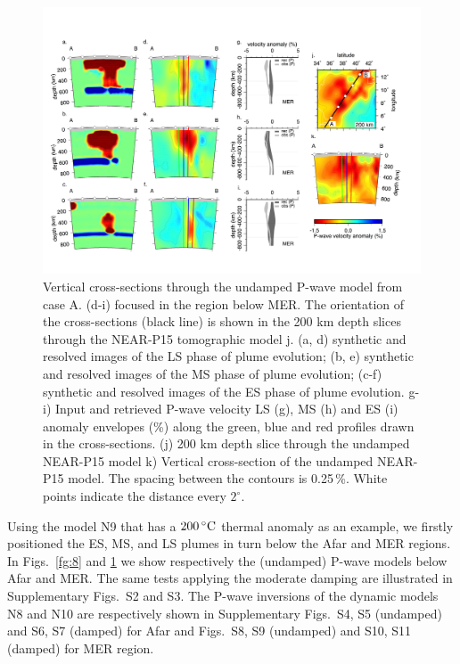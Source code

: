 \documentclass[a4paper,10pt,twocolumn]{paper}
\begin{document}
\begin{figure}
\centering
\includegraphics[width=16cm]{../figures-working/fig10.png}
\caption{Vertical cross-sections through the undamped P-wave model from case A. (d-i) focused in the region below MER.  The orientation of the cross-sections (black line) is shown in the 200 km depth slices through the NEAR-P15 tomographic model  j.  (a, d) synthetic and resolved images of the LS phase of plume evolution; (b, e) synthetic and resolved images of the MS phase of plume evolution; (c-f) synthetic and resolved images of the ES phase of plume evolution. g-i) Input and retrieved P-wave velocity LS (g), MS (h) and ES (i) anomaly envelopes (\%) along the green, blue and red profiles drawn in the cross-sections. (j) 200 km depth slice through the undamped NEAR-P15 model k) Vertical cross-section of the undamped NEAR-P15 model. The spacing between the contours is 0.25\,\%. White points indicate the distance every $2^{\circ}$.}
\label{fg:9}
\end{figure}

Using the model N9 that has a $200\rm\,^{\circ}C$ thermal anomaly as an example, we firstly positioned the ES, MS, and LS plumes in turn below the Afar and MER regions. In Figs.~\ref{fg:8} and \ref{fg:9} we show respectively the (undamped) P-wave models below Afar and MER. The same tests applying the moderate damping are illustrated in Supplementary Figs.~S2 and S3. The P-wave inversions of the dynamic models N8 and N10 are respectively shown in Supplementary Figs.~S4, S5 (undamped) and S6, S7 (damped) for Afar and Figs.~S8, S9 (undamped) and S10, S11 (damped) for MER region.
\end{document}
